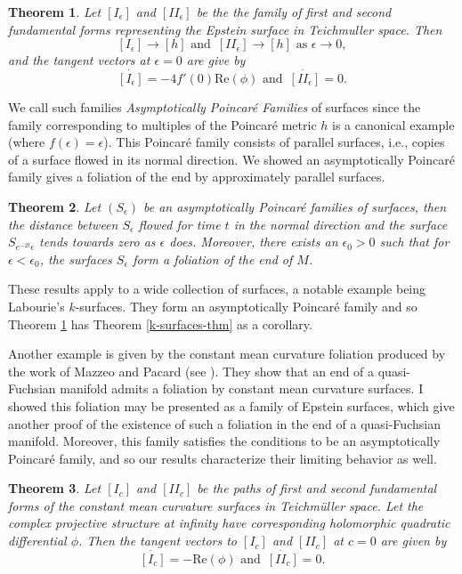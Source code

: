\documentclass[11pt]{amsart}
\newtheorem{thm}{Theorem}[section]
\begin{document}
\begin{thm}
\label{asym-poincare-thm}
Let $[I_\epsilon]$ and $[I\!I_\epsilon]$ be the the family of first and second fundamental forms representing the Epstein surface in Teichmuller space. 
Then
\[
[I_\epsilon] \to  [h]  \text{ and } \, [I\!I_\epsilon] \to [h]  \text{ as } \epsilon \to 0,
\]
and the tangent vectors at $\epsilon = 0$ are give by
\[
\dot{[I_\epsilon]} = -4 f'(0) \mathrm{Re}(\phi) \text{ and } \, \dot{[I\!I_\epsilon]} = 0. 
\]
\end{thm}

We call such families \emph{Asymptotically Poincar\'e Families} of surfaces since the family corresponding to multiples of the Poincar\'e metric $h$ is a canonical example (where $f(\epsilon) = \epsilon$). 
This Poincar\'e family consists of parallel surfaces, i.e., copies of a surface flowed in its normal direction. 
We showed an asymptotically Poincar\'e family gives a foliation of the end by approximately parallel surfaces.

\begin{thm}
Let $(S_\epsilon)$ be an asymptotically Poincar\'e families of surfaces, then the distance between $S_\epsilon$ flowed for time $t$ in the normal direction and the surface $S_{e^{-2t}\epsilon}$ tends towards zero as $\epsilon$ does.
Moreover, there exists an $\epsilon_0 > 0$ such that for $\epsilon < \epsilon_0$, the surfaces $S_\epsilon$ form a foliation of the end of $M$.
\end{thm}

These results apply to a wide collection of surfaces, a notable example being Labourie's $k$-surfaces. 
They form an asymptotically Poincar\'e family and so Theorem \ref{asym-poincare-thm} has Theorem \ref{k-surfaces-thm} as a corollary. 


Another example is given by the constant mean curvature foliation produced by the work of Mazzeo and Pacard (see \cite{mazzeo-pacard2011}).
They show that an end of a quasi-Fuchsian manifold admits a foliation by constant mean curvature surfaces. 
I showed this foliation may be presented as a family of Epstein surfaces, which give another proof of the existence of such a foliation in the end of a quasi-Fuchsian manifold. 
Moreover, this family satisfies the conditions to be an asymptotically Poincar\'e family, and so our results characterize their limiting behavior as well. 

\begin{thm}
\label{cmc-surfaces-thm}
Let $[I_c]$ and $[I\!I_c]$ be the paths of first and second fundamental forms of the constant mean curvature surfaces in Teichm\"uller space. 
Let the complex projective structure at infinity have corresponding holomorphic quadratic differential $\phi$. 
Then the tangent vectors to $[I_c]$ and $[I\!I_c]$ at $c=0$ are given by
\[
\dot{[I_c]} = -\mathrm{Re}(\phi) \text{ and } \, \dot{[I\!I_c]} = 0.
\]
\end{thm}
\end{document}
